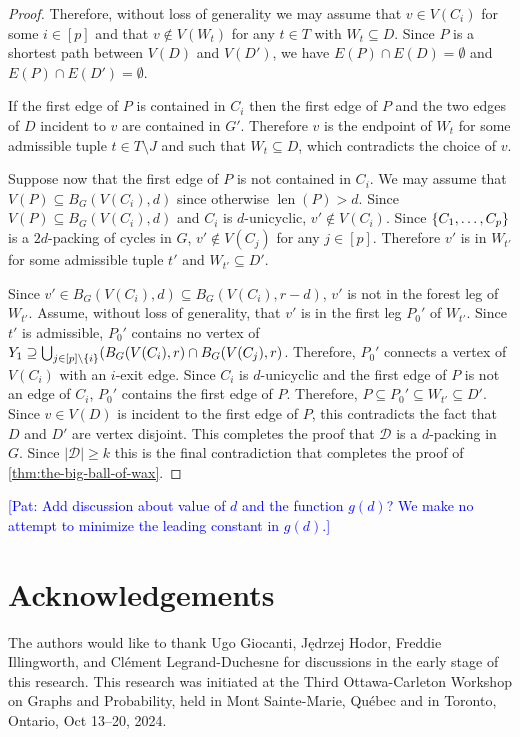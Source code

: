 \documentclass{patmorin}
\newcommand{\pat}[1]{\textcolor{Blue}{[Pat: #1]}}
\DeclareMathOperator{\len}{len}
\DeclarePairedDelimiter\set{\{}{\}}
\begin{document}
\begin{proof}
Therefore, without loss of generality we may assume that $v\in V(C_i)$ for some $i\in[p]$ and that $v\notin V(W_t)$ for any $t\in T$ with $W_t\subseteq D$.  Since $P$ is a shortest path between $V(D)$ and $V(D')$, we have $E(P)\cap E(D)=\emptyset$ and $E(P)\cap E(D')=\emptyset$.  

If the first edge of $P$ is contained in $C_i$ then the first edge of $P$ and the two edges of $D$ incident to $v$ are contained in $G'$.  Therefore $v$ is the endpoint of $W_t$ for some admissible tuple $t\in T\setminus J$ and such that $W_t\subseteq D$, which contradicts the choice of $v$.


Suppose now that the first edge of $P$ is not contained in $C_i$.  We may assume that $V(P)\subseteq B_G(V(C_i),d)$ since otherwise $\len(P)>d$.  Since $V(P)\subseteq B_G(V(C_i),d)$ and $C_i$ is $d$-unicyclic, $v'\not\in V(C_i)$.  Since $\set{C_1,\ldots,C_p}$ 
is a $2d$-packing of cycles in $G$, $v'\not\in V(C_j)$ for any $j\in[p]$. Therefore $v'$ is in $W_{t'}$ for some admissible tuple $t'$ and $W_{t'}\subseteq D'$.  

Since $v'\in B_G(V(C_i),d)\subseteq B_G(V(C_i),r-d)$, $v'$ is not in the forest leg of $W_{t'}$.  
Assume, without loss of generality, that $v'$ is in the first leg $P_0'$ of $W_{t'}$.  
Since $t'$ is admissible, $P_0'$ contains no vertex of $Y_1\supseteq \bigcup_{j\in[p]\setminus \set{i}} (B_G(V(C_i),r)\cap B_G(V(C_j),r)$. 
Therefore, $P_0'$ connects a vertex of $V(C_i)$ with an $i$-exit edge.
Since $C_i$ is $d$-unicyclic and the first edge of $P$ is not an edge of $C_i$, $P_0'$ contains the first edge of $P$. Therefore, $P\subseteq P_0'\subseteq W_{t'}\subseteq D'$.  Since $v\in V(D)$ is incident to the first edge of $P$, this contradicts the fact that $D$ and $D'$ are vertex disjoint.
This completes the proof that $\mathcal{D}$ is a $d$-packing in $G$. Since $|\mathcal{D}|\geq k$ this is the final contradiction that completes the proof of \cref{thm:the-big-ball-of-wax}.
\end{proof}

\pat{Add discussion about value of $d$ and the function $g(d)$? We make no attempt to minimize the leading constant in $g(d)$.}


\section*{Acknowledgements}
The authors would like to thank 
Ugo Giocanti,
Jędrzej Hodor, 
Freddie Illingworth, and 
Clément Legrand-Duchesne 
for discussions in the early stage of this research.
This research was initiated at the Third Ottawa-Carleton Workshop on Graphs and Probability, held in Mont Sainte-Marie, Québec and in Toronto, Ontario, Oct 13–20, 2024.
\end{document}
